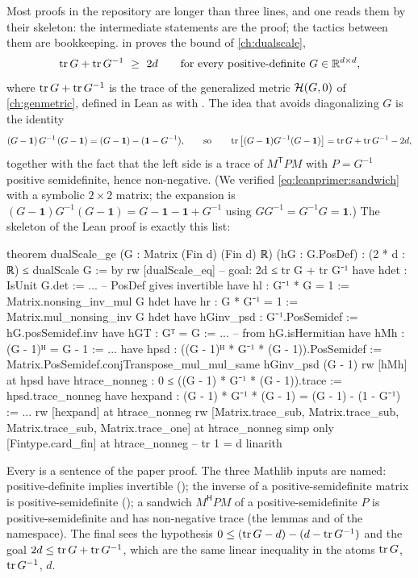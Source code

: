 Most proofs in the repository are longer than three lines, and one reads them by their
 skeleton: the intermediate statements are the proof; the tactics between them
are bookkeeping.  in 
proves the bound of \cref{ch:dualscale},
\begin{equation}
\operatorname{tr} G+\operatorname{tr} G^{-1}\ \ge\ 2d\qquad\text{for every positive-definite }G\in\mathbb{R}^{d\times d},
\label{eq:leanprimer:bound}
\end{equation}
where $\operatorname{tr} G+\operatorname{tr} G^{-1}$ is the trace of the generalized metric $\mathcal{H}(G,0)$ of
\cref{ch:genmetric}, defined in Lean as
 with
.
The idea that avoids diagonalizing $G$ is the identity
\begin{equation}
(G-\mathbf 1)\,G^{-1}\,(G-\mathbf 1) = (G-\mathbf 1)-(\mathbf 1-G^{-1}),
\qquad\text{so}\qquad
\operatorname{tr}\big[(G-\mathbf 1)G^{-1}(G-\mathbf 1)\big] = \operatorname{tr} G+\operatorname{tr} G^{-1}-2d,
\label{eq:leanprimer:sandwich}
\end{equation}
together with the fact that the left side is a trace of $M^{\mathsf T}PM$ with $P=G^{-1}$
positive semidefinite, hence non-negative. (We verified \eqref{eq:leanprimer:sandwich} with
a symbolic $2\times2$ matrix; the expansion is
$(G-\mathbf 1)G^{-1}(G-\mathbf 1)=G-\mathbf 1-\mathbf 1+G^{-1}$ using $GG^{-1}=G^{-1}G=\mathbf 1$.)
The skeleton of the Lean proof is exactly this list:
\begin{leancode}
theorem dualScale_ge (G : Matrix (Fin d) (Fin d) ℝ) (hG : G.PosDef) :
    (2 * d : ℝ) ≤ dualScale G := by
  rw [dualScale_eq]                                  -- goal: 2d ≤ tr G + tr G⁻¹
  have hdet : IsUnit G.det := ...                    -- PosDef gives invertible
  have hl : G⁻¹ * G = 1 := Matrix.nonsing_inv_mul G hdet
  have hr : G * G⁻¹ = 1 := Matrix.mul_nonsing_inv G hdet
  have hGinv_psd : G⁻¹.PosSemidef := hG.posSemidef.inv
  have hGT : Gᵀ = G := ...                           -- from hG.isHermitian
  have hMh : (G - 1)ᴴ = G - 1 := ...
  have hpsd : ((G - 1)ᴴ * G⁻¹ * (G - 1)).PosSemidef :=
    Matrix.PosSemidef.conjTranspose_mul_mul_same hGinv_psd (G - 1)
  rw [hMh] at hpsd
  have htrace_nonneg : 0 ≤ ((G - 1) * G⁻¹ * (G - 1)).trace := hpsd.trace_nonneg
  have hexpand : (G - 1) * G⁻¹ * (G - 1) = (G - 1) - (1 - G⁻¹) := ...
  rw [hexpand] at htrace_nonneg
  rw [Matrix.trace_sub, Matrix.trace_sub, Matrix.trace_sub, Matrix.trace_one]
    at htrace_nonneg
  simp only [Fintype.card_fin] at htrace_nonneg      -- tr 1 = d
  linarith
\end{leancode}
Every  is a sentence of the paper proof. The three Mathlib inputs are named:
positive-definite implies invertible (); the inverse of a positive-semidefinite
matrix is positive-semidefinite (); a sandwich $M^{\mathsf H}PM$ of a
positive-semidefinite $P$ is positive-semidefinite and has non-negative trace (the lemmas
 and  of the 
namespace). The final  sees the hypothesis
$0\le(\operatorname{tr} G-d)-(d-\operatorname{tr} G^{-1})$ and the goal $2d\le\operatorname{tr} G+\operatorname{tr} G^{-1}$, which are the same
linear inequality in the atoms $\operatorname{tr} G$, $\operatorname{tr} G^{-1}$, $d$.

